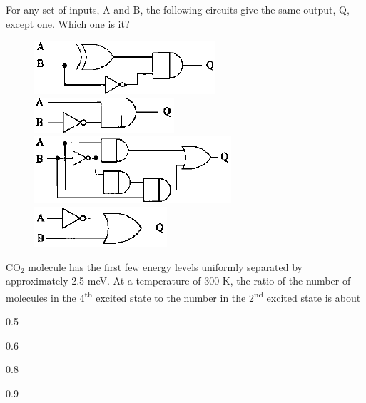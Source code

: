 \documentclass{exam}
\begin{document}
\begin{questions}
\question For any set of inputs, A and B, the following circuits give the same output, Q, except one. Which one is it?\hfill{}

\begin{enumerate} \begin{multicols}{4}
\begin{figure}[H]
	\item \caption*{} \label{41a} \includegraphics[width=0.51\columnwidth]{pics/41a.png}
	\item \caption*{} \label{41b} \includegraphics[width=0.51\columnwidth]{pics/41b.png}
	\item \caption*{} \label{41c} \includegraphics[width=0.51\columnwidth]{pics/41c.png}
	\item \caption*{} \label{41d} \includegraphics[width=0.51\columnwidth]{pics/41d.png}
\end{figure}
\end{multicols} \end{enumerate}

\question CO$_2$ molecule has the first few energy levels uniformly separated by approximately 2.5 meV. At a temperature of 300 K, the ratio of the number of molecules in the 4\textsuperscript{th} excited state to the number in the 2\textsuperscript{nd} excited state is about\hfill{}

\begin{enumerate} \begin{multicols}{4}
	\item 0.5 \item 0.6 \item 0.8 \item 0.9
\end{multicols} \end{enumerate}


\end{questions}
\end{document}
